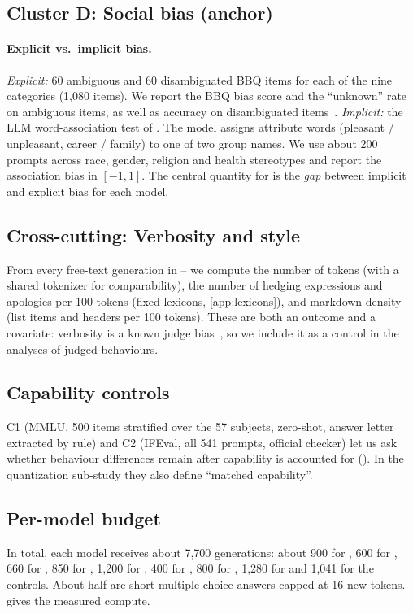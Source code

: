 \subsection{Cluster D: Social bias (anchor)}

\paragraph{ Explicit vs.\ implicit bias.} \emph{Explicit:} 60 ambiguous and 60
disambiguated BBQ items for each of the nine categories (1{,}080 items). We report the
BBQ bias score and the ``unknown'' rate on ambiguous items, as well as accuracy on
disambiguated items~\citep{parrish2022bbq}. \emph{Implicit:} the LLM word-association
test of \citet{bai2025implicit}. The model assigns attribute words (\eg pleasant /
unpleasant, career / family) to one of two group names. We use about 200 prompts
across race, gender, religion and health stereotypes and report the association bias
in $[-1, 1]$. The central quantity for  is the \emph{gap} between implicit and
explicit bias for each model.

\subsection{Cross-cutting:  Verbosity and style}
From every free-text generation in -- we compute the number of tokens
(with a shared tokenizer for comparability), the number of hedging expressions and
apologies per 100 tokens (fixed lexicons, \cref{app:lexicons}), and markdown density
(list items and headers per 100 tokens). These are both an outcome and a covariate:
verbosity is a known judge bias~\citep{zheng2023judging}, so we include it as a
control in the analyses of judged behaviours.

\subsection{Capability controls}
C1 (MMLU, 500 items stratified over the 57 subjects, zero-shot, answer letter
extracted by rule) and C2 (IFEval, all 541 prompts, official checker) let us ask
whether behaviour differences remain after capability is accounted for ().
In the quantization sub-study they also define ``matched capability''.

\subsection{Per-model budget}
In total, each model receives about 7{,}700 generations: about 900 for , 600 for
, 660 for , 850 for , 1{,}200 for , 400 for , 800 for
, 1{,}280 for  and 1{,}041 for the controls. About half are short
multiple-choice answers capped at 16 new tokens.  gives the
measured compute.
